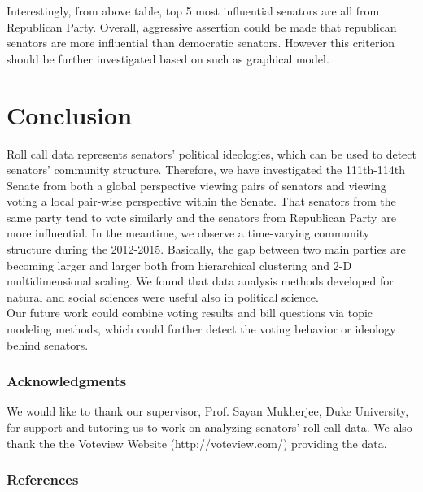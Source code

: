 \documentclass{article} %
\begin{document}
Interestingly, from above table, top 5 most influential senators are all from Republican Party. Overall, aggressive assertion could be made that republican senators are more influential than democratic senators. However this criterion should be further investigated based on such as graphical model.

\section{Conclusion}
Roll call data represents senators' political ideologies, which can be used to detect senators' community structure. Therefore, we have investigated the 111th-114th Senate from both a global perspective viewing pairs of senators and viewing voting a local pair-wise perspective within the Senate. That senators from the same party tend to vote similarly and the senators from Republican Party are more influential. In the meantime, we observe a time-varying community structure during the 2012-2015. Basically, the gap between two main parties are becoming larger and larger both from hierarchical clustering and 2-D multidimensional scaling. We found that data analysis methods developed for natural and social sciences were useful also in political science.\\
Our future work could combine voting results and bill questions via topic modeling methods, which could further detect the voting behavior or ideology behind senators.



\subsubsection*{Acknowledgments}

We would like to thank our supervisor, Prof. Sayan Mukherjee, Duke University, for support and tutoring us to work on analyzing senators' roll call data. We also thank the the Voteview Website (http://voteview.com/) providing the data.
\subsubsection*{References}
\end{document}
